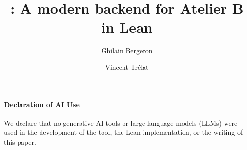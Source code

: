 \documentclass[a4paper,UKenglish,cleveref, autoref, thm-restate, numberwithinsect]{lipics-v2021}
\title{\barrel: A modern backend for Atelier B in Lean}
\author{Ghilain Bergeron}{Universit\'e de Lorraine, CNRS, Inria, LORIA, Nancy, France}{}{0009-0008-2814-3480}{}
\author{Vincent Tr\'elat}{Universit\'e de Lorraine, CNRS, Inria, LORIA, Nancy, France}{}{0009-0006-4143-3939}{ANR project BLaSST (ANR-21-CE25-0010).}
\begin{document}
\maketitle

\begin{abstract}
	
\end{abstract}













\paragraph*{Declaration of AI Use}
We declare that no generative AI tools or large language models (LLMs) were used in the development of the tool, the Lean implementation, or the writing of this paper.


\end{document}
